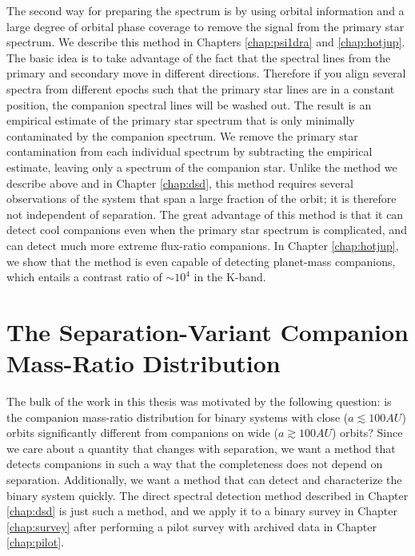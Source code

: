 \documentclass{utthesis}
\begin{document}
The second way for preparing the spectrum is by using orbital information and a large degree of orbital phase coverage to remove the signal from the primary star spectrum. We describe this method in Chapters \ref{chap:psi1dra} and \ref{chap:hotjup}. The basic idea is to take advantage of the fact that the spectral lines from the primary and secondary move in different directions. Therefore if you align several spectra from different epochs such that the primary star lines are in a constant position, the companion spectral lines will be washed out. The result is an empirical estimate of the primary star spectrum that is only minimally contaminated by the companion spectrum. We remove the primary star contamination from each individual spectrum by subtracting the empirical estimate, leaving only a spectrum of the companion star. Unlike the method we describe above and in Chapter \ref{chap:dsd}, this method requires several observations of the system that span a large fraction of the orbit; it is therefore not independent of separation. The great advantage of this method is that it can detect cool companions even when the primary star spectrum is complicated, and can detect much more extreme flux-ratio companions. In Chapter \ref{chap:hotjup}, we show that the method is even capable of detecting planet-mass companions, which entails a contrast ratio of $\sim 10^4$ in the K-band.

\section{The Separation-Variant Companion Mass-Ratio Distribution}

The bulk of the work in this thesis was motivated by the following question: is the companion mass-ratio distribution for binary systems with close ($a \lesssim 100 AU$) orbits significantly different from companions on wide ($a \gtrsim 100 AU$) orbits? Since we care about a quantity that changes with separation, we want a method that detects companions in such a way that the completeness does not depend on separation. Additionally, we want a method that can detect and characterize the binary system quickly. The direct spectral detection method described in Chapter \ref{chap:dsd} is just such a method, and we apply it to a binary survey in Chapter \ref{chap:survey} after performing a pilot survey with archived data in Chapter \ref{chap:pilot}.
\end{document}
